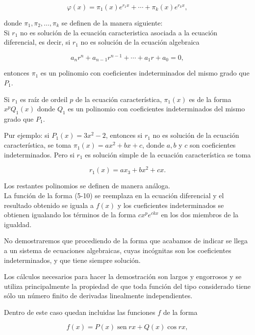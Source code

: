 \documentclass[10pt]{article}
\theoremstyle{plain}
\theoremstyle{definition}
\theoremstyle{remark}
\begin{document}
\begin{equation*}
\varphi(x)=\pi_{1}(x) e^{r_{1} x}+\cdots+\pi_{k}(x) e^{r_{k} x}, \tag{5-10}
\end{equation*}


donde $\pi_{1}, \pi_{2}, \ldots, \pi_{k}$ se definen de la manera siguiente:\\
Si $r_{1}$ no es solución de la ecuación caracteristica asociada a la ecuación diferencial, es decir, si $r_{1}$ no es solución de la ecuación algebraica

$$
a_{n} r^{n}+a_{n-1} r^{n-1}+\cdots+a_{1} r+a_{0}=0,
$$

entonces $\pi_{1}$ es un polinomio con coeficientes indeterminados del mismo grado que $P_{1}$.

Si $r_{1}$ es raíz de ordeil $p$ de la ecuación característica, $\pi_{1}(x)$ es de la forma $x^{p} Q_{1}(x)$ donde $Q_{1}$ es un polinomio con coeficientes indeterminados del mismo grado que $P_{1}$.

Pur ejemplo: si $P_{1}(x)=3 x^{2}-2$, entonces si $r_{1}$ no es solución de la ecuación característica, se toma $\pi_{1}(x)=a x^{2}+b x+c$, donde $a, b$ y $c$ son coeficientes indeterminados. Pero si $r_{1}$ es solución simple de la ecuación característica se toma


$$
r_{1}(x)=a x_{3}+b x^{2}+c x .
$$

Los restantes polinomios se definen de manera análoga.\\
La función de la forma (5-10) se reemplaza en la ecuación diferencial y el resultado obtenido se iguala a $f(x)$ y los cueficientes indeterminados se obtienen igualando los términos de la forma $c x^{p} e^{c k x}$ en los dos miembros de la igualdad.

No demostraremos que procediendo de la forma que acabamos de indicar se llega a un sistema de ecuaciones algebraicas, cuyas incógnitas son los coeficientes indeterminados, y que tiene siempre solución.

Los cálculos necesarios para hacer la demostración son largos y engorrosos y se utiliza principalmente la propiedad de que toda función del tipo considerado tiene sólo un número finito de derivadas linealmente independientes.

Dentro de este caso quedan incluidas las funciones $f$ de la forma


\begin{equation*}
f(x)=P(x) \operatorname{sen} r x+Q(x) \cos r x, \tag{5-11}
\end{equation*}
\end{document}
